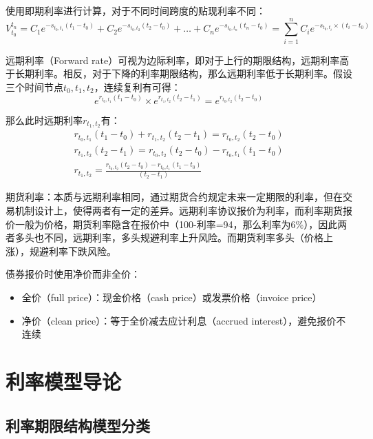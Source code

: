 \documentclass[11pt]{article}
\begin{document}
使用即期利率进行计算，对于不同时间跨度的贴现利率不同：
\begin{equation*}
    V_{t_0}^{t_n} = C_1 e^{-s_{t_0,t_1}(t_1-t_0)} + C_2 e^{-s_{t_0,t_2}(t_2-t_0)}
    + \dots + C_n e^{-s_{t_0,t_n}(t_n-t_0)}
    = \sum_{i=1}^{n} C_i e^{-s_{t_0,t_i}\times (t_i-t_0)}
\end{equation*}

远期利率（Forward rate）可视为边际利率，即对于上行的期限结构，远期利率高于长期利率。相反，对于下降的利率期限结构，那么远期利率低于长期利率。假设三个时间节点$t_0,t_1,t_2$，连续复利有可得：
\begin{equation*}
    e^{r_{t_0,t_1}(t_1-t_0)} \times e^{r_{t_1,t_2}(t_2-t_1)} = e^{r_{t_0,t_2}(t_2-t_0)}
\end{equation*}

那么此时远期利率$r_{t_1,t_2}$有：
\begin{gather*}
    r_{t_0,t_1}(t_1-t_0) + r_{t_1,t_2}(t_2-t_1) = r_{t_0,t_2}(t_2-t_0) \\
    r_{t_1,t_2}(t_2-t_1) = r_{t_0,t_2}(t_2-t_0) - r_{t_0,t_1}(t_1-t_0) \\
    r_{t_1,t_2} = \frac{r_{t_0,t_2}(t_2-t_0) - r_{t_0,t_1}(t_1-t_0)}{(t_2-t_1)}
\end{gather*}

期货利率：本质与远期利率相同，通过期货合约规定未来一定期限的利率，但在交易机制设计上，使得两者有一定的差异。远期利率协议报价为利率，而利率期货报价一般为价格，期货利率隐含在报价中（100-利率=94，那么利率为6\%），因此两者多头也不同，远期利率，多头规避利率上升风险。而期货利率多头（价格上涨），规避利率下跌风险。


债券报价时使用净价而非全价：
\begin{itemize}
    \item 全价（full price）：现金价格（cash price）或发票价格（invoice price）
    \item 净价（clean price）：等于全价减去应计利息（accrued interest），避免报价不连续
\end{itemize}


\section{利率模型导论}

\subsection{利率期限结构模型分类}
\end{document}
